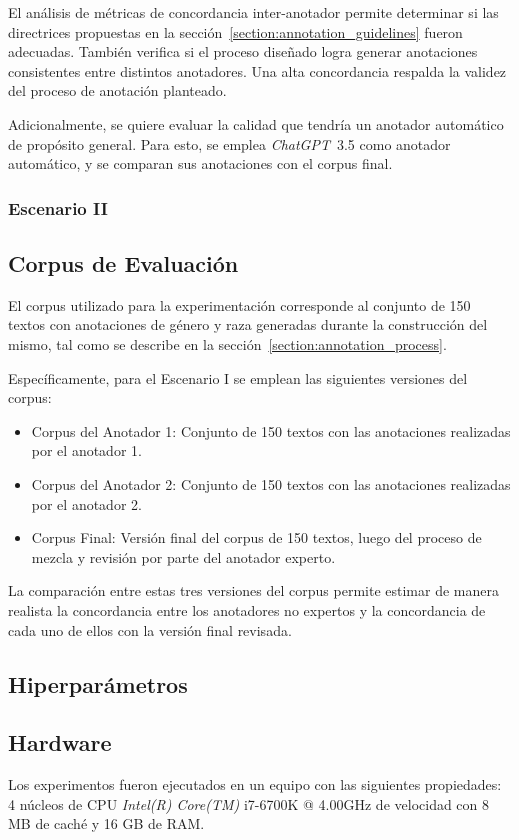 El an\'alisis de m\'etricas de concordancia inter-anotador permite determinar si las directrices propuestas en la 
secci\'on~\ref{section:annotation_guidelines} fueron adecuadas. Tambi\'en verifica si el proceso dise\~nado logra generar
anotaciones consistentes entre distintos anotadores. Una alta concordancia respalda la validez del proceso de anotaci\'on
planteado.

Adicionalmente, se quiere evaluar la calidad que tendr\'ia un anotador autom\'atico de prop\'osito general. Para esto, se 
emplea \emph{ChatGPT}~3.5 como anotador autom\'atico, y se comparan sus anotaciones con el corpus final.

\subsubsection{Escenario II}
\subsection{Corpus de Evaluaci\'on}
El corpus utilizado para la experimentaci\'on corresponde al conjunto de 150 textos con anotaciones de g\'enero y raza
generadas durante la construcci\'on del mismo, tal como se describe en la secci\'on~\ref{section:annotation_process}.

Espec\'ificamente, para el Escenario I se emplean las siguientes versiones del corpus:
\begin{itemize}
    \item Corpus del Anotador 1: Conjunto de 150 textos con las anotaciones realizadas por el anotador 1.
    \item Corpus del Anotador 2: Conjunto de 150 textos con las anotaciones realizadas por el anotador 2.
    \item Corpus Final: Versi\'on final del corpus de 150 textos, luego del proceso de mezcla y revisi\'on por parte 
    del anotador experto.
\end{itemize}

La comparaci\'on entre estas tres versiones del corpus permite estimar de manera realista la concordancia entre los anotadores 
no expertos y la concordancia de cada uno de ellos con la versi\'on final revisada. 

\subsection{Hiperpar\'ametros}
\subsection{Hardware}
Los experimentos fueron ejecutados en un equipo con las siguientes propiedades: 4 n\'ucleos de CPU \emph{Intel(R) Core(TM)} i7-6700K
@ 4.00GHz de velocidad con 8 MB de cach\'e y 16 GB de RAM.

